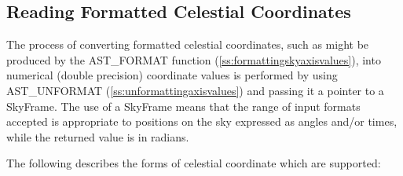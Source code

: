 \documentclass[twoside,11pt]{article}
\newcommand{\htmlref}[2]{#1}
\newcommand{\secref}[1]{\S\ref{#1}}
\renewcommand{\secref}[1]{\ref{#1}}
\begin{document}
\subsection{\label{ss:unformattingskyaxisvalues}Reading Formatted Celestial Coordinates}

The process of converting formatted celestial coordinates, such as
might be produced by the \htmlref{AST\_FORMAT}{AST_FORMAT} function
(\secref{ss:formattingskyaxisvalues}), into numerical (double
precision) coordinate values is performed by using \htmlref{AST\_UNFORMAT}{AST_UNFORMAT}
(\secref{ss:unformattingaxisvalues}) and passing it a pointer to a
\htmlref{SkyFrame}{SkyFrame}. The use of a SkyFrame means that the range of input formats
accepted is appropriate to positions on the sky expressed as angles
and/or times, while the returned value is in radians.

The following describes the forms of celestial coordinate which are
supported:
\end{document}
